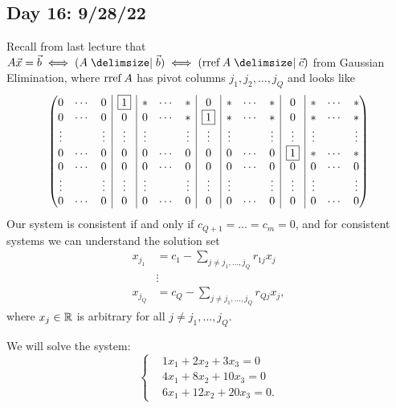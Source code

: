 \documentclass[main.tex]{subfiles}
\begin{document}
\subsection{Day 16: 9/28/22}
Recall from last lecture that $A\vec{x} = \vec{b}\iff (A \mid \vec{b})\iff (\rref A \mid \vec{c})$ from Gaussian Elimination, where $\operatorname{rref} A$ has pivot columns $j_1, j_2, \ldots , j_Q$ and looks like
\[\left(\begin{array}{@{}c c c | c | c c c | c | c c c | c | c c c@{}}
    0 & \cdots & 0 & \boxed{1} & * & \cdots & * & 0 & * & \cdots & * & 0 & * & \cdots & *  \\
    0 & \cdots & 0 & 0 & 0 & \cdots & * & \boxed{1} & * & \cdots & * & 0 & * & \cdots & *  \\
    \vdots & & \vdots & \vdots & \vdots & & \vdots & \vdots & \vdots & & \vdots & \vdots & \vdots & & \vdots \\
    0 & \cdots & 0 & 0 & 0 & \cdots & 0 & 0 & 0 & \cdots & 0 & \boxed{1} & * & \cdots & *  \\
    0 & \cdots & 0 & 0 & 0 & \cdots & 0 & 0 & 0 & \cdots & 0 & 0 & 0 & \cdots & 0  \\
    \vdots & & \vdots & \vdots & \vdots & & \vdots & \vdots & \vdots & & \vdots & \vdots & \vdots & & \vdots \\
    0 & \cdots & 0 & 0 & 0 & \cdots & 0 & 0 & 0 & \cdots & 0 & 0 & 0 & \cdots & 0
\end{array}\right)\]
Our system is consistent if and only if $c_{Q + 1} = \ldots = c_m = 0$, and for consistent systems we can understand the solution set
\begin{align*}
    x_{j_1} &= c_1 - \sum_{j \neq j_1, \ldots , j_Q} r_{1j}x_j \\
    &\vdots \\
    x_{j_Q} &= c_Q - \sum_{j\neq j_1, \ldots , j_Q} r_{Qj}x_j,
\end{align*}
where $x_j\in \mathbb R$ is arbitrary for all $j\neq j_1, \ldots , j_Q$.

\begin{example}
    We will solve the system:
    \[\left\{\begin{aligned}
    &1x_1 + 2x_2 + 3x_3 = 0 \\
    &4x_1 + 8x_2 + 10x_3 = 0 \\
    &6x_1 + 12x_2 + 20x_3 = 0.
    \end{aligned}\right.\]
\end{example}
\end{document}
